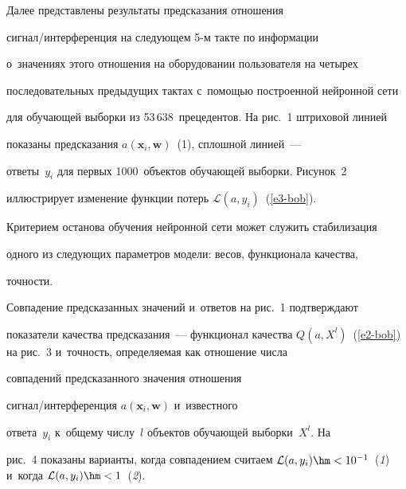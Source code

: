   


  Далее представлены результаты предсказания отношения  


сиг\-нал\!/\!ин\-тер\-фе\-рен\-ция на следующем 5-м такте по информации 


о~значениях этого отношения на оборудовании пользователя на четырех 


последовательных предыдущих тактах с~помощью построенной нейронной сети 


для обучающей выборки из 53\,638~прецедентов. На рис.~1 штриховой линией 


показаны предсказания $a(\mathbf{x}_i, \mathbf{w})$~(1), сплошной линией~--- 


ответы~$y_i$ для первых 1000~объектов обучающей выборки. Рисунок~2 


иллюстрирует изменение функции потерь $\mathcal{L}(a,y_i)$~(\ref{e3-bob}). 


Критерием останова обучения нейронной сети может служить стабилизация 


одного из сле\-ду\-ющих параметров модели: весов, функционала качества, 


точ\-ности. 


  


  


  Совпадение предсказанных значений и~ответов на рис.~1 подтверждают 


показатели качества предсказания~--- функционал качества $Q(a, 


X^l)$~(\ref{e2-bob}) на рис.~3 и~точ\-ность, определяемая как отношение числа 


совпадений предсказанного значения отношения  


сиг\-нал\!/\!ин\-тер\-фе\-рен\-ция $a(\mathbf{x}_i,\mathbf{w})$ и~известного 


ответа~$y_i$ к~общему числу~$l$ объектов обучающей выборки~$X^l$. На 


рис.~4 показаны варианты, когда совпадением считаем $\mathcal{L}(a,y_i)\hm< 


10^{-1}$~(\textit{1}) и~когда $\mathcal{L}(a, y_i)\hm<1$~(\textit{2}).


  


